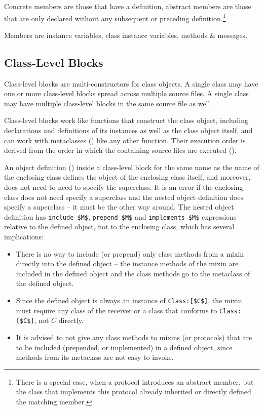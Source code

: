 Concrete members are those that have a definition, abstract members are those that are only declared without any subsequent or preceding definition.\footnote{There is a special case, when a protocol introduces an abstract member, but the class that implements this protocol already inherited or directly defined the matching member.}

Members are instance variables, class instance variables, methods \& messages. 

\subsection{Class-Level Blocks}
\label{sec:class-level-blocks}

Class-level blocks are multi-constructors for class objects. A single class may have one or more class-level blocks spread across multiple source files. A single class may have multiple class-level blocks in the same source file as well. 

Class-level blocks work like functions that construct the class object, including declarations and definitions of its instances as well as the class object itself, and can work with metaclasses () like any other function. Their execution order is derived from the order in which the containing source files are executed (). 

An object definition () inside a class-level block for the same name as the name of the enclosing class defines the object of the enclosing class itself, and moreover, does not need to need to specify the superclass. It is an error if the enclosing class does not need specify a superclass and the nested object definition does specify a superclass -- it must be the other way around. The nested object definition has \lstinline!include $M$!, \lstinline!prepend $M$! and \lstinline!implements $M$! expressions relative to the defined object, not to the enclosing class, which has several implications: 
\begin{itemize}
\item There is no way to include (or prepend) only class methods from a mixin directly into the defined object -- the instance methods of the mixin are included in the defined object and the class methods go to the metaclass of the defined object. 
\item Since the defined object is always an instance of \lstinline!Class:[$C$]!, the mixin must require any class of the receiver or a class that conforms to \lstinline!Class:[$C$]!, not $C$ directly. 
\item It is advised to not give any class methods to mixins (or protocols) that are to be included (prepended, or implemented) in a defined object, since methods from its metaclass are not easy to invoke. 
\end{itemize}

